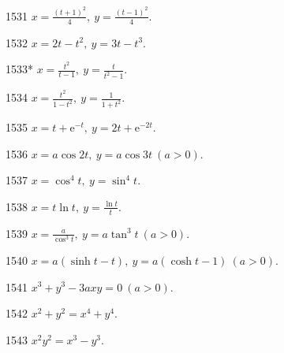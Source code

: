 
\begin{prob}[S]{1531}
$x = \frac{(t+1)^2}{4},\ y = \frac{(t-1)^2}{4}.$
\end{prob}

\begin{prob}[S]{1532}
$x = 2t - t^2,\ y = 3t - t^3.$
\end{prob}

\begin{prob}[S]{1533*}
$x = \frac{t^2}{t - 1},\ y = \frac{t}{t^2 - 1}.$
\end{prob}

\begin{prob}[S]{1534}
$x = \frac{t^2}{1 - t^2},\ y = \frac{1}{1 + t^2}.$
\end{prob}

\begin{prob}[S]{1535}
$x = t + \mathrm{e}^{-t},\ y = 2t + \mathrm{e}^{-2t}.$
\end{prob}

\begin{prob}[S]{1536}
$x = a\cos 2t,\ y = a\cos 3t\ (a > 0).$
\end{prob}

\begin{prob}[S]{1537}
$x = \cos^4 t,\ y = \sin^4 t.$
\end{prob}

\begin{prob}[S]{1538}
$x = t\ln t,\ y = \frac{\ln t}{t}.$
\end{prob}

\begin{prob}[S]{1539}
$x = \frac{a}{\cos^3 t},\ y = a\tan^3 t\ (a > 0).$
\end{prob}

\begin{prob}[S]{1540}
$x = a(\sinh t - t),\ y = a(\cosh t - 1)\ (a > 0).$
\end{prob}


\begin{prob}[M]{1541}
$x^3 + y^3 - 3axy = 0\ (a > 0).$
\end{prob}

\begin{prob}[S]{1542}
$x^2 + y^2 = x^4 + y^4.$
\end{prob}

\begin{prob}[S]{1543}
$x^2 y^2 = x^3 - y^3.$
\end{prob}

